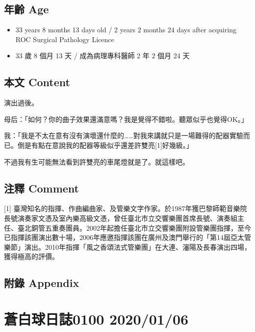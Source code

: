 \documentclass[
]{article}
\providecommand{\tightlist}{%
  \setlength{\itemsep}{0pt}\setlength{\parskip}{0pt}}
\begin{document}
\hypertarget{ux5e74ux9f61-age-35}{%
\subsection{年齡 Age}\label{ux5e74ux9f61-age-35}}

\begin{itemize}
\tightlist
\item
  33 years 8 months 13 days old / 2 years 2 months 24 days after
  acquiring ROC Surgical Pathology Licence
\item
  33 歲 8 個月 13 天 / 成為病理專科醫師 2 年 2 個月 24 天
\end{itemize}

\hypertarget{ux672cux6587-content-35}{%
\subsection{本文 Content}\label{ux672cux6587-content-35}}

演出過後。

母后：「如何？你的曲子效果還滿意嗎？我是覺得不錯啦。聽眾似乎也覺得OK。」

我：「我是不太在意有沒有演壞還什麼的\ldots\ldots 對我來講就只是一場難得的配器實驗而已。倒是有點在意說我的配器等級似乎還差許雙亮{[}1{]}好幾級。」

不過我有生可能無法看到許雙亮的車尾燈就是了。就這樣吧。

\hypertarget{ux6ce8ux91cb-comment-34}{%
\subsection{注釋 Comment}\label{ux6ce8ux91cb-comment-34}}

{[}1{]}
臺灣知名的指揮、作曲編曲家、及管樂文字作家。於1987年獲巴黎師範音樂院長號演奏家文憑及室內樂高級文憑，曾任臺北市立交響樂團首席長號、演奏組主任、臺北銅管五重奏團員。2002年起擔任臺北市立交響樂團附設管樂團指揮，至今已指揮該團演出數十場，2006年應邀指揮該團在廣州及澳門舉行的「第14屆亞太管樂節」演出。2010年指揮「風之香頌法式管樂團」在大連、瀋陽及長春演出四場，獲得極高的評價。

\hypertarget{ux9644ux9304-appendix-35}{%
\subsection{附錄 Appendix}\label{ux9644ux9304-appendix-35}}

\hypertarget{ux84bcux767dux7403ux65e5ux8a8c0100-20200106}{%
\section{蒼白球日誌0100
2020/01/06}\label{ux84bcux767dux7403ux65e5ux8a8c0100-20200106}}
\end{document}
